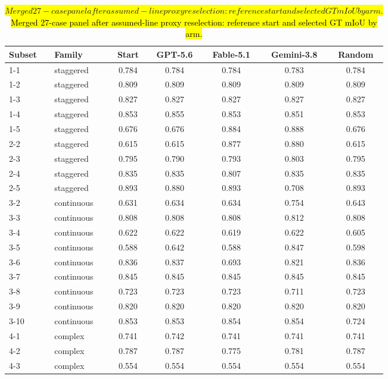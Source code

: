 \documentclass[a4paper,fleqn]{cas-dc}
\let\texthl\hl
\renewcommand{\hl}[1]{\ifmmode\colorbox{yellow}{\ensuremath{#1}}\else\texthl{#1}\fi}
\begin{document}
\begin{table}[t]
\caption{\hl{Merged 27-case panel after assumed-line proxy reselection: reference start and selected GT mIoU by arm.}}\label{tab:panel-audit}
{\footnotesize
\begin{tabular*}{\textwidth}{@{\extracolsep{\fill}} l l c cccc @{}}
\toprule
Subset & Family & Start & GPT-5.6 & Fable-5.1 & Gemini-3.8 & Random \\
\midrule
1-1 & staggered & 0.784 & 0.784 & 0.784 & 0.783 & 0.784 \\
1-2 & staggered & 0.809 & 0.809 & 0.809 & 0.809 & 0.809 \\
1-3 & staggered & 0.827 & 0.827 & 0.827 & 0.827 & 0.827 \\
\rowcolor{yellow!25}1-4 & staggered & 0.853 & 0.855 & 0.853 & 0.851 & 0.853 \\
1-5 & staggered & 0.676 & 0.676 & 0.884 & 0.888 & 0.676 \\
2-2 & staggered & 0.615 & 0.615 & 0.877 & 0.880 & 0.615 \\
\rowcolor{yellow!25}2-3 & staggered & 0.795 & 0.790 & 0.793 & 0.803 & 0.795 \\
2-4 & staggered & 0.835 & 0.835 & 0.807 & 0.835 & 0.835 \\
2-5 & staggered & 0.893 & 0.880 & 0.893 & 0.708 & 0.893 \\
3-2 & continuous & 0.631 & 0.634 & 0.634 & 0.754 & 0.643 \\
\rowcolor{yellow!25}3-3 & continuous & 0.808 & 0.808 & 0.808 & 0.812 & 0.808 \\
3-4 & continuous & 0.622 & 0.622 & 0.619 & 0.622 & 0.605 \\
3-5 & continuous & 0.588 & 0.642 & 0.588 & 0.847 & 0.598 \\
3-6 & continuous & 0.836 & 0.837 & 0.693 & 0.821 & 0.836 \\
\rowcolor{yellow!25}3-7 & continuous & 0.845 & 0.845 & 0.845 & 0.845 & 0.845 \\
\rowcolor{yellow!25}3-8 & continuous & 0.723 & 0.723 & 0.723 & 0.711 & 0.723 \\
3-9 & continuous & 0.820 & 0.820 & 0.820 & 0.820 & 0.820 \\
\rowcolor{yellow!25}3-10 & continuous & 0.853 & 0.853 & 0.854 & 0.854 & 0.724 \\
\rowcolor{yellow!25}4-1 & complex & 0.741 & 0.742 & 0.741 & 0.741 & 0.741 \\
4-2 & complex & 0.787 & 0.787 & 0.775 & 0.781 & 0.787 \\
4-3 & complex & 0.554 & 0.554 & 0.554 & 0.554 & 0.554 \\

\end{tabular*}}
\end{table}
\end{document}
